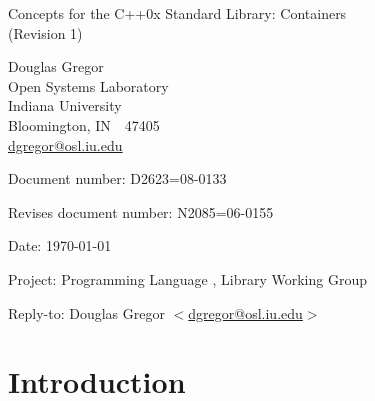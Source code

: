 \documentclass[american,twoside]{book}
\begin{document}
\raggedbottom

\begin{titlepage}
\begin{center}
\huge
Concepts for the C++0x Standard Library: Containers\\
(Revision 1)

\vspace{0.5in}

\normalsize
Douglas Gregor  \\
Open Systems Laboratory \\
Indiana University \\
Bloomington, IN\ \  47405 \\
\href{mailto:dgregor@osl.iu.edu}{dgregor@osl.iu.edu}
\end{center}

\vspace{1in}
\par\noindent Document number: D2623=08-0133\vspace{-6pt}
\par\noindent Revises document number: N2085=06-0155\vspace{-6pt}
\par\noindent Date: \today\vspace{-6pt}
\par\noindent Project: Programming Language \Cpp{}, Library Working Group\vspace{-6pt}
\par\noindent Reply-to: Douglas Gregor $<$\href{mailto:dgregor@osl.iu.edu}{dgregor@osl.iu.edu}$>$\vspace{-6pt}

\section*{Introduction}
\end{titlepage}

\pagestyle{fancy}
\fancyhead[LE,RO]{\textbf{\rightmark}}
\fancyhead[RE]{\textbf{\leftmark\hspace{1em}\thepage}}
\fancyhead[LO]{\textbf{\thepage\hspace{1em}\leftmark}}


\renewcommand{\sectionmark}[1]{\markright{\thesection\hspace{1em}#1}}
\renewcommand{\chaptermark}[1]{\markboth{#1}{}}
\end{document}
